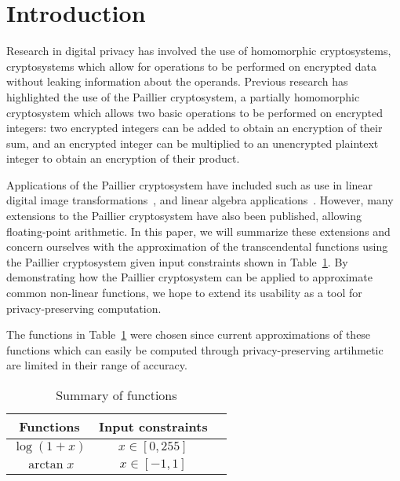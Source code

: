 \section{Introduction}
Research in digital privacy has involved the use of homomorphic cryptosystems, cryptosystems which allow for operations to be performed on encrypted data without leaking information about the operands.
Previous research has highlighted the use of the Paillier cryptosystem, a partially homomorphic cryptosystem which allows two basic operations to be performed on encrypted integers: two encrypted integers can be added to obtain an encryption of their sum, and an encrypted integer can be multiplied to an unencrypted plaintext integer to obtain an encryption of their product.

Applications of the Paillier cryptosystem have included such as use in linear digital image transformations~\cite{ziad_cryptoimg:_2016}, and linear algebra applications~\cite{hutchison_privacy-preserving_2009}. However, many extensions to the Paillier cryptosystem have also been published, allowing floating-point arithmetic. In this paper, we will summarize these extensions and concern ourselves with the approximation of the transcendental functions using the Paillier cryptosystem given input constraints shown in Table~\ref{tab:inputconstraints}. By demonstrating how the Paillier cryptosystem can be applied to approximate common non-linear functions, we hope to extend its usability as a tool for privacy-preserving computation.

The functions in Table~\ref{tab:inputconstraints} were chosen since current approximations of these functions which can easily be computed through privacy-preserving artihmetic are limited in their range of accuracy.
\begin{table}
	\caption{Summary of functions}
	\label{tab:inputconstraints}
	\begin{tabular}{ccl}
		\toprule
		Functions & Input constraints\\
		\midrule
		$\log\left(1+x\right)$ & $x\in[0,255]$\\
		$\arctan x$ & $x\in[-1,1]$\\
	    \bottomrule
    \end{tabular}
\end{table}
